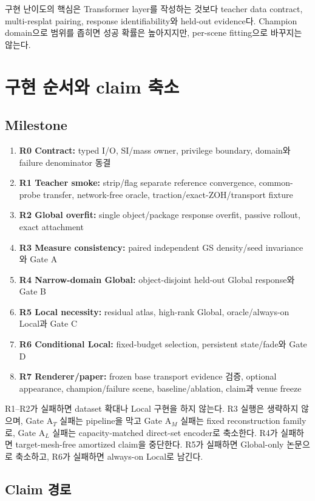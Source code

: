\documentclass[11pt]{article}
\begin{document}
구현 난이도의 핵심은 Transformer layer를 작성하는 것보다 teacher data contract, multi-resplat pairing,
response identifiability와 held-out evidence다. Champion domain으로 범위를 좁히면 성공 확률은 높아지지만,
per-scene fitting으로 바꾸지는 않는다.

\section{구현 순서와 claim 축소}

\subsection{Milestone}

\begin{enumerate}
  \item \textbf{R0 Contract:} typed I/O, SI/mass owner, privilege boundary, domain와 failure denominator 동결
  \item \textbf{R1 Teacher smoke:} strip/flag separate reference convergence, common-probe transfer,
  network-free oracle, traction/exact-ZOH/transport fixture
  \item \textbf{R2 Global overfit:} single object/package response overfit, passive rollout, exact attachment
  \item \textbf{R3 Measure consistency:} paired independent GS density/seed invariance와 Gate A
  \item \textbf{R4 Narrow-domain Global:} object-disjoint held-out Global response와 Gate B
  \item \textbf{R5 Local necessity:} residual atlas, high-rank Global, oracle/always-on Local과 Gate C
  \item \textbf{R6 Conditional Local:} fixed-budget selection, persistent state/fade와 Gate D
  \item \textbf{R7 Renderer/paper:} frozen base transport evidence 검증, optional appearance,
  champion/failure scene, baseline/ablation, claim과 venue freeze
\end{enumerate}

R1--R2가 실패하면 dataset 확대나 Local 구현을 하지 않는다. R3 실행은 생략하지 않으며,
Gate A\(_T\) 실패는 pipeline을 막고 Gate A\(_M\) 실패는 fixed reconstruction family로,
Gate A\(_L\) 실패는 capacity-matched direct-set encoder로 축소한다.
R4가 실패하면 target-mesh-free amortized claim을 중단한다.
R5가 실패하면 Global-only 논문으로 축소하고, R6가 실패하면 always-on Local로 남긴다.

\subsection{Claim 경로}
\end{document}
